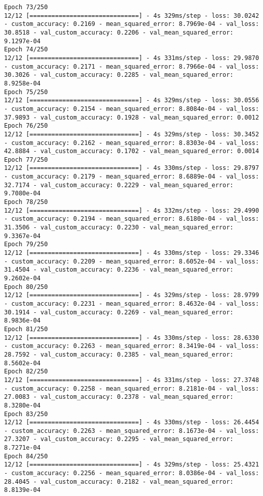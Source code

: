 \begin{lstlisting}
Epoch 73/250
12/12 [==============================] - 4s 329ms/step - loss: 30.0242 - custom_accuracy: 0.2169 - mean_squared_error: 8.7969e-04 - val_loss: 30.8518 - val_custom_accuracy: 0.2206 - val_mean_squared_error: 9.1297e-04
Epoch 74/250
12/12 [==============================] - 4s 331ms/step - loss: 29.9870 - custom_accuracy: 0.2171 - mean_squared_error: 8.7966e-04 - val_loss: 30.3026 - val_custom_accuracy: 0.2285 - val_mean_squared_error: 8.9258e-04
Epoch 75/250
12/12 [==============================] - 4s 329ms/step - loss: 30.0556 - custom_accuracy: 0.2154 - mean_squared_error: 8.8084e-04 - val_loss: 37.9893 - val_custom_accuracy: 0.1928 - val_mean_squared_error: 0.0012
Epoch 76/250
12/12 [==============================] - 4s 329ms/step - loss: 30.3452 - custom_accuracy: 0.2162 - mean_squared_error: 8.8303e-04 - val_loss: 42.8884 - val_custom_accuracy: 0.1702 - val_mean_squared_error: 0.0014
Epoch 77/250
12/12 [==============================] - 4s 330ms/step - loss: 29.8797 - custom_accuracy: 0.2179 - mean_squared_error: 8.6889e-04 - val_loss: 32.7174 - val_custom_accuracy: 0.2229 - val_mean_squared_error: 9.7080e-04
Epoch 78/250
12/12 [==============================] - 4s 332ms/step - loss: 29.4990 - custom_accuracy: 0.2194 - mean_squared_error: 8.6180e-04 - val_loss: 31.3506 - val_custom_accuracy: 0.2230 - val_mean_squared_error: 9.3367e-04
Epoch 79/250
12/12 [==============================] - 4s 330ms/step - loss: 29.3346 - custom_accuracy: 0.2209 - mean_squared_error: 8.6052e-04 - val_loss: 31.4504 - val_custom_accuracy: 0.2236 - val_mean_squared_error: 9.2602e-04
Epoch 80/250
12/12 [==============================] - 4s 329ms/step - loss: 28.9799 - custom_accuracy: 0.2231 - mean_squared_error: 8.4632e-04 - val_loss: 30.1914 - val_custom_accuracy: 0.2269 - val_mean_squared_error: 8.9836e-04
Epoch 81/250
12/12 [==============================] - 4s 330ms/step - loss: 28.6330 - custom_accuracy: 0.2263 - mean_squared_error: 8.3419e-04 - val_loss: 28.7592 - val_custom_accuracy: 0.2385 - val_mean_squared_error: 8.5602e-04
Epoch 82/250
12/12 [==============================] - 4s 331ms/step - loss: 27.3748 - custom_accuracy: 0.2258 - mean_squared_error: 8.2181e-04 - val_loss: 27.0083 - val_custom_accuracy: 0.2378 - val_mean_squared_error: 8.3280e-04
Epoch 83/250
12/12 [==============================] - 4s 330ms/step - loss: 26.4454 - custom_accuracy: 0.2263 - mean_squared_error: 8.1673e-04 - val_loss: 27.3207 - val_custom_accuracy: 0.2295 - val_mean_squared_error: 8.7271e-04
Epoch 84/250
12/12 [==============================] - 4s 329ms/step - loss: 25.4321 - custom_accuracy: 0.2256 - mean_squared_error: 8.0386e-04 - val_loss: 28.4045 - val_custom_accuracy: 0.2182 - val_mean_squared_error: 8.8139e-04

\end{lstlisting}
